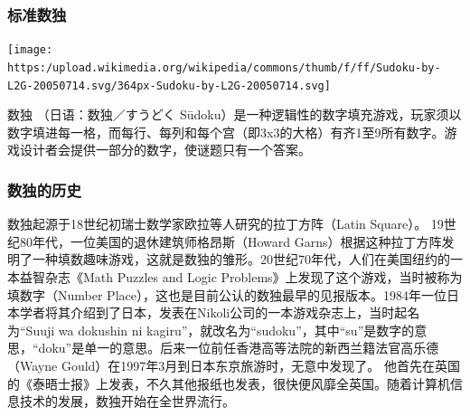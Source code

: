 \documentclass[xcolor=table]{beamer}
\begin{document}
\mdxtitleblockstart{}

\mdxauthorend\mdtitleauthorrunning{}{}\mdxtitleblockend%

\begin{mdframe}%

\frametitle{标准数独}\label{heading-section}%

\begin{mdcenter}%

\noindent{}\texttt{[image: https:/upload.wikimedia.org/wikipedia/commons/thumb/f/ff/Sudoku-by-L2G-20050714.svg/364px-Sudoku-by-L2G-20050714.svg]}{}%
\end{mdcenter}%

\mdhr{}%

\noindent{}数独 （日语：数独／すうどく Sūdoku）是一种逻辑性的数字填充游戏，玩家须以数字填进每一格，而每行、每列和每个宫（即3x3的大格）有齐1至9所有数字。游戏设计者会提供一部分的数字，使谜题只有一个答案。%
\end{mdframe}\label{section}%

\begin{mdframe}%

\frametitle{数独的历史}\label{heading-section}%

\noindent{}数独起源于18世纪初瑞士数学家欧拉等人研究的拉丁方阵（Latin Square）。
19世纪80年代，一位美国的退休建筑师格昂斯（Howard Garns）根据这种拉丁方阵发明了一种填数趣味游戏，这就是数独的雏形。20世纪70年代，人们在美国纽约的一本益智杂志《Math Puzzles and Logic Problems》上发现了这个游戏，当时被称为填数字（Number Place），这也是目前公认的数独最早的见报版本。1984年一位日本学者将其介绍到了日本，发表在Nikoli公司的一本游戏杂志上，当时起名为“Suuji wa dokushin ni kagiru”，就改名为“sudoku”，其中“su”是数字的意思，“doku”是单一的意思。后来一位前任香港高等法院的新西兰籍法官高乐德（Wayne Gould）在1997年3月到日本东京旅游时，无意中发现了。
他首先在英国的《泰晤士报》上发表，不久其他报纸也发表，很快便风靡全英国。随着计算机信息技术的发展，数独开始在全世界流行。%
\end{mdframe}\label{section}%
\end{document}
